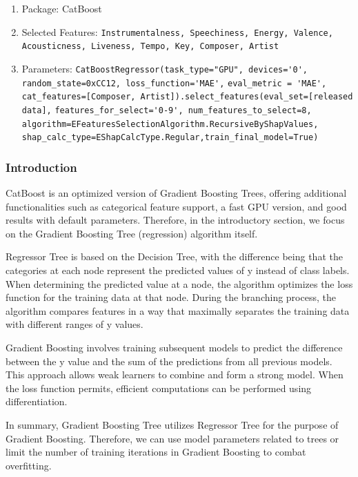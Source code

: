 \documentclass[10pt,letterpaper]{article}
\begin{document}
\begin{enumerate}
	\item Package: CatBoost
	\item Selected Features: \texttt{Instrumentalness, Speechiness, Energy, Valence, Acousticness, Liveness, Tempo, Key, Composer, Artist}
	\item Parameters: \verb|CatBoostRegressor(task_type="GPU", devices='0', random_state=0xCC12, loss_function='MAE',|\linebreak
						\verb|eval_metric = 'MAE', cat_features=[Composer, Artist]).select_features(eval_set=[released data],|\linebreak
						\verb|features_for_select='0-9', num_features_to_select=8,|\linebreak
						\verb|algorithm=EFeaturesSelectionAlgorithm.RecursiveByShapValues,|\linebreak
						\verb|shap_calc_type=EShapCalcType.Regular,train_final_model=True)|
\end{enumerate}

\subsubsection{Introduction}

CatBoost is an optimized version of Gradient Boosting Trees, offering additional functionalities such as categorical feature support, a fast GPU version, and good results with default parameters. Therefore, in the introductory section, we focus on the Gradient Boosting Tree (regression) algorithm itself.

Regressor Tree is based on the Decision Tree, with the difference being that the categories at each node represent the predicted values of y instead of class labels. When determining the predicted value at a node, the algorithm optimizes the loss function for the training data at that node. During the branching process, the algorithm compares features in a way that maximally separates the training data with different ranges of y values.

Gradient Boosting involves training subsequent models to predict the difference between the y value and the sum of the predictions from all previous models. This approach allows weak learners to combine and form a strong model. When the loss function permits, efficient computations can be performed using differentiation.

In summary, Gradient Boosting Tree utilizes Regressor Tree for the purpose of Gradient Boosting. Therefore, we can use model parameters related to trees or limit the number of training iterations in Gradient Boosting to combat overfitting.
\end{document}
